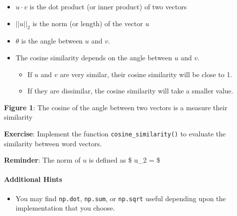 \documentclass[11pt]{article}
\begin{document}
\begin{itemize}
\itemsep1pt\parskip0pt
\item
  $u \cdot v$ is the dot product (or inner product) of two vectors
\item
  $||u||_2$ is the norm (or length) of the vector $u$
\item
  $\theta$ is the angle between $u$ and $v$.
\item
  The cosine similarity depends on the angle between $u$ and $v$.

  \begin{itemize}
  \itemsep1pt\parskip0pt
  \item
    If $u$ and $v$ are very similar, their cosine similarity will be
    close to 1.
  \item
    If they are dissimilar, the cosine similarity will take a smaller
    value.
  \end{itemize}
\end{itemize}

\textbf{Figure 1}: The cosine of the angle between two vectors is a
measure their similarity

\textbf{Exercise}: Implement the function \texttt{cosine\_similarity()}
to evaluate the similarity between word vectors.

\textbf{Reminder}: The norm of $u$ is defined as \$
\textbar{}\textbar{}u\textbar{}\textbar{}\_2 =
\$

\paragraph{Additional Hints}\label{additional-hints}

\begin{itemize}
\itemsep1pt\parskip0pt
\item
  You may find \texttt{np.dot}, \texttt{np.sum}, or \texttt{np.sqrt}
  useful depending upon the implementation that you choose.
\end{itemize}
\end{document}
